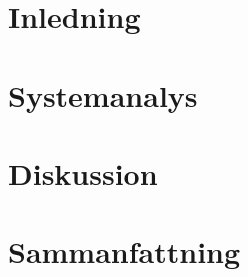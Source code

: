 \documentclass[usenames,dvipsnames]{article}
\begin{document}

\tableofcontents\thispagestyle{empty}
\clearpage

\section{Inledning}


\newpage\section{Systemanalys}


\newpage\section{Diskussion}


\newpage\section{Sammanfattning}

\end{document}

